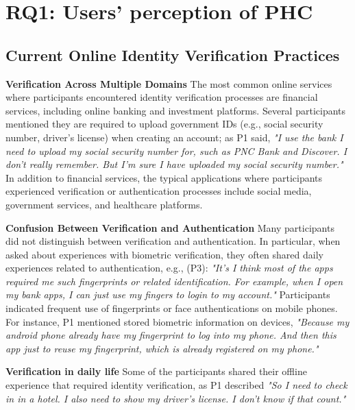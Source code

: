 \section{RQ1: Users’ perception of PHC}

\subsection{Current Online Identity Verification Practices}

\textbf{Verification Across Multiple Domains} The most common online services where participants encountered identity verification processes are financial services, including online banking and investment platforms. Several participants mentioned they are required to upload government IDs (e.g., social security number, driver's license) when creating an account; as P1 said, \textit{"I use the bank I need to upload my social security number for, such as PNC Bank and Discover. I don't really remember. But I'm sure I have uploaded my social security number."} In addition to financial services, the typical applications where participants experienced verification or authentication processes include social media, government services, and healthcare platforms. 

\textbf{Confusion Between Verification and Authentication} Many participants did not distinguish between verification and authentication. In particular, when asked about experiences with biometric verification, they often shared daily experiences related to authentication, e.g., (P3): \textit{"It's I think most of the apps required me such fingerprints or related identification. For example, when I open my bank apps, I can just use my fingers to login to my account."} Participants indicated frequent use of fingerprints or face authentications on mobile phones. For instance, P1 mentioned stored biometric information on devices, \textit{"Because my android phone already have my fingerprint to log into my phone. And then this app just to reuse my fingerprint, which is already registered on my phone."}

\textbf{Verification in daily life} Some of the participants shared their offline experience that required identity verification, as P1 described \textit{"So I need to check in in a hotel. I also need to show my driver's license. I don't know if that count."} 

